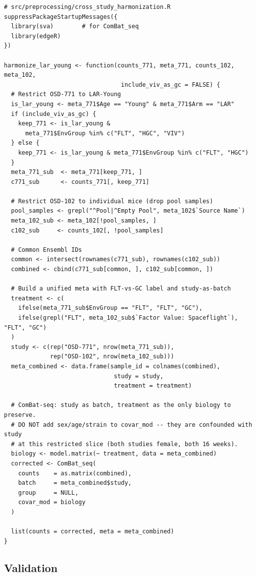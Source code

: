 \documentclass[11pt]{article}
\begin{document}
\begin{lstlisting}[style=rstyle,caption={LAR-Young cohort harmonization for OSD-771 + OSD-102 pooling.}]
# src/preprocessing/cross_study_harmonization.R
suppressPackageStartupMessages({
  library(sva)        # for ComBat_seq
  library(edgeR)
})

harmonize_lar_young <- function(counts_771, meta_771, counts_102, meta_102,
                                 include_viv_as_gc = FALSE) {
  # Restrict OSD-771 to LAR-Young
  is_lar_young <- meta_771$Age == "Young" & meta_771$Arm == "LAR"
  if (include_viv_as_gc) {
    keep_771 <- is_lar_young &
      meta_771$EnvGroup %in% c("FLT", "HGC", "VIV")
  } else {
    keep_771 <- is_lar_young & meta_771$EnvGroup %in% c("FLT", "HGC")
  }
  meta_771_sub  <- meta_771[keep_771, ]
  c771_sub      <- counts_771[, keep_771]

  # Restrict OSD-102 to individual mice (drop pool samples)
  pool_samples <- grepl("^Pool|^Empty Pool", meta_102$`Source Name`)
  meta_102_sub <- meta_102[!pool_samples, ]
  c102_sub     <- counts_102[, !pool_samples]

  # Common Ensembl IDs
  common <- intersect(rownames(c771_sub), rownames(c102_sub))
  combined <- cbind(c771_sub[common, ], c102_sub[common, ])

  # Build a unified meta with FLT-vs-GC label and study-as-batch
  treatment <- c(
    ifelse(meta_771_sub$EnvGroup == "FLT", "FLT", "GC"),
    ifelse(grepl("FLT", meta_102_sub$`Factor Value: Spaceflight`), "FLT", "GC")
  )
  study <- c(rep("OSD-771", nrow(meta_771_sub)),
             rep("OSD-102", nrow(meta_102_sub)))
  meta_combined <- data.frame(sample_id = colnames(combined),
                               study = study,
                               treatment = treatment)

  # ComBat-seq: study as batch, treatment as the only biology to preserve.
  # DO NOT add sex/age/strain to covar_mod -- they are confounded with study
  # at this restricted slice (both studies female, both 16 weeks).
  biology <- model.matrix(~ treatment, data = meta_combined)
  corrected <- ComBat_seq(
    counts    = as.matrix(combined),
    batch     = meta_combined$study,
    group     = NULL,
    covar_mod = biology
  )

  list(counts = corrected, meta = meta_combined)
}
\end{lstlisting}

\subsection{Validation}
\end{document}
